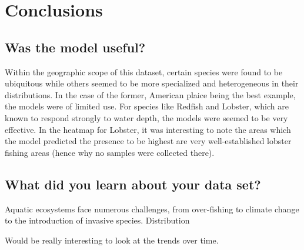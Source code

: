 \section{Conclusions}

\subsection{Was the model useful?}

Within the geographic scope of this dataset, certain species were found to be ubiquitous while others seemed to be more specialized and heterogeneous in their distributions.
In the case of the former, American plaice being the best example, the models were of limited use.
For species like Redfish and Lobster, which are known to respond strongly to water depth, the models were seemed to be very effective.
In the heatmap for Lobster, it was interesting to note the areas which the model predicted the presence to be highest are
very well-established lobster fishing areas (hence why no samples were collected there).



\subsection{What did you learn about your data set?}

Aquatic ecosystems face numerous challenges, from over-fishing to climate change to the introduction of invasive species.
Distribution



Would be really interesting to look at the trends over time.